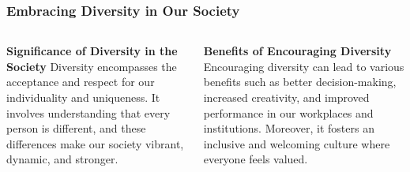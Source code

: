 \documentclass[5pt]{beamer}
\begin{document}
\begin{frame}
\frametitle{Embracing Diversity in Our Society}
\begin{columns}
\begin{column}{0.45\textwidth}
\begin{block}{\textbf{Significance of Diversity in the Society}}
Diversity encompasses the acceptance and respect for our individuality and uniqueness. It involves understanding that every person is different, and these differences make our society vibrant, dynamic, and stronger.
\end{block}
\end{column}
\begin{column}{0.45\textwidth}
\begin{block}{\textbf{Benefits of Encouraging Diversity}}
Encouraging diversity can lead to various benefits such as better decision-making, increased creativity, and improved performance in our workplaces and institutions. Moreover, it fosters an inclusive and welcoming culture where everyone feels valued.
\end{block}
\end{column}
\end{columns}
\end{frame}
\end{document}
